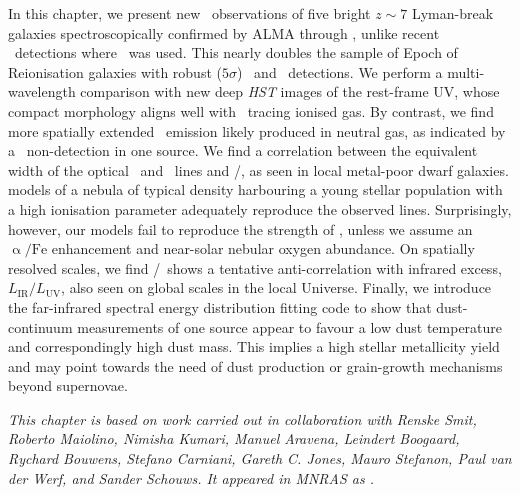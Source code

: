     \fancyhf{}
    \fancyfoot[C]{\color{ALMAsky}\thepage}
    \newpage
    \setFancyHdr
\fi

\vspace*{\fill}

\noindent In this chapter, we present new \OIIILam\ observations of five bright $z \sim 7$ Lyman-break galaxies spectroscopically confirmed by ALMA through \CIILam, unlike recent \OIIIf\ detections where \lya\ was used. This nearly doubles the sample of Epoch of Reionisation galaxies with robust ($5 \sigma$) \CII\ and \OIIIf\ detections. We perform a multi-wavelength comparison with new deep \textit{HST} images of the rest-frame UV, whose compact morphology aligns well with \OIIIf\ tracing ionised gas. By contrast, we find more spatially extended \CII\ emission likely produced in neutral gas, as indicated by a \NIILam\ non-detection in one source. We find a correlation between the equivalent width of the optical \OIIIf\ and \Hbeta\ lines and \OIIIf/\CII, as seen in local metal-poor dwarf galaxies.  models of a nebula of typical density harbouring a young stellar population with a high ionisation parameter adequately reproduce the observed lines. Surprisingly, however, our models fail to reproduce the strength of \OIIILam, unless we assume an $\mathrm{\upalpha/Fe}$ enhancement and near-solar nebular oxygen abundance. On spatially resolved scales, we find \OIIIf/\CII\ shows a tentative anti-correlation with infrared excess, $L_\text{IR}/L_\text{UV}$, also seen on global scales in the local Universe. Finally, we introduce the far-infrared spectral energy distribution fitting code  to show that dust-continuum measurements of one source appear to favour a low dust temperature and correspondingly high dust mass. This implies a high stellar metallicity yield and may point towards the need of dust production or grain-growth mechanisms beyond supernovae.

\vspace{3ex}
\begin{mdframed}[backgroundcolor=black!2.5]
    \textsl{This chapter is based on work carried out in collaboration with Renske Smit, Roberto Maiolino, Nimisha Kumari, Manuel Aravena, Leindert Boogaard, Rychard Bouwens, Stefano Carniani, Gareth C. Jones, Mauro Stefanon, Paul van der Werf, and Sander Schouws. It appeared in MNRAS as \citet{2022MNRAS.515.1751W}.}
\end{mdframed}
\vspace*{\fill}

\newpage

